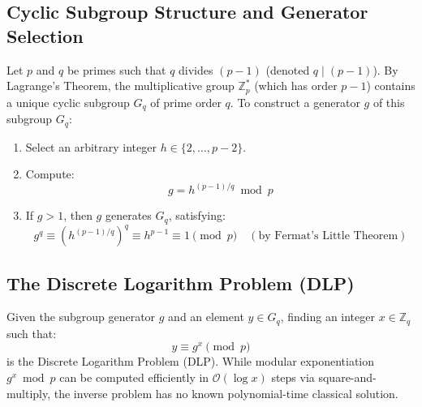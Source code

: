 \subsection{Cyclic Subgroup Structure and Generator Selection}
Let $p$ and $q$ be primes such that $q$ divides $(p - 1)$ (denoted $q \mid (p - 1)$). By Lagrange's Theorem, the multiplicative group $\mathbb{Z}_p^*$ (which has order $p - 1$) contains a unique cyclic subgroup $G_q$ of prime order $q$.
To construct a generator $g$ of this subgroup $G_q$:
\begin{enumerate}
    \item Select an arbitrary integer $h \in \{2, \dots, p - 2\}$.
    \item Compute:
    \begin{equation}
    g = h^{(p - 1)/q} \bmod p
    \end{equation}
    \item If $g > 1$, then $g$ generates $G_q$, satisfying:
    \begin{equation}
    g^q \equiv (h^{(p - 1)/q})^q \equiv h^{p - 1} \equiv 1 \pmod p \quad (\text{by Fermat's Little Theorem})
    \end{equation}
\end{enumerate}

\subsection{The Discrete Logarithm Problem (DLP)}
Given the subgroup generator $g$ and an element $y \in G_q$, finding an integer $x \in \mathbb{Z}_q$ such that:
\begin{equation}
y \equiv g^x \pmod p
\end{equation}
is the Discrete Logarithm Problem (DLP). While modular exponentiation $g^x \bmod p$ can be computed efficiently in $\mathcal{O}(\log x)$ steps via square-and-multiply, the inverse problem has no known polynomial-time classical solution.

